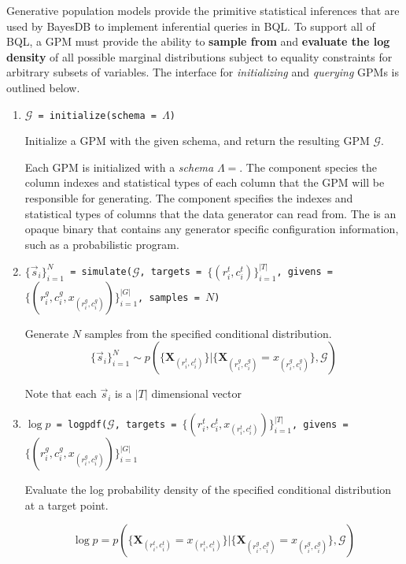 \documentclass[10pt,letterpaper]{article}
\newcommand{\set}[1]{\{#1\}}
\begin{document}
Generative population models provide the primitive statistical inferences that
are used by BayesDB to implement inferential queries in BQL. To support all of
BQL, a GPM must provide the ability to \textbf{sample from} and \textbf{evaluate
the log density} of all possible marginal distributions subject to equality
constraints for arbitrary subsets of variables. The interface for
\textit{initializing} and \textit{querying} GPMs is outlined below.

\begin{enumerate}

\item \texttt{$\mathcal{G}$ = initialize(schema = $\Lambda$)}

    Initialize a GPM with the given schema, and return the resulting GPM
    $\mathcal{G}$.

    Each GPM is initialized with a \textit{schema} $\Lambda=$. The  component species
    the column indexes and statistical types of each column that the GPM will be
    responsible for generating. The  component specifies the
    indexes and statistical types of columns that the data generator can read
    from. The  is an opaque binary that contains any generator
    specific configuration information, such as a probabilistic program.

\item \texttt{$\set{\vec{s}_i}_{i=1}^N$ = 
    simulate($\mathcal{G}$, targets = $\set{(r_i^t,c_i^t)}_{i=1}^{|T|}$, givens
    = $\set{(r_i^g, c_i^g, x_{(r_i^g, c_i^g)})}_{i=1}^{|G|}$, samples = $N$)}

    Generate $N$ samples from the specified conditional distribution.
    $$
    \set{\vec{s}_i}_{i=1}^N \sim p( \set{ \mathbf{X}_{(r_i^t,c_i^t)} } |
    \set{ \mathbf{X}_{(r_i^g,c_i^g)} = x_{(r_i^g,c_i^g)} }, \mathcal{G})
    $$

    Note that each $\vec{s}_i$ is a $|T|$ dimensional vector

\item \texttt{$\log p$ =
    logpdf($\mathcal{G}$, targets = $\set{(r_i^t, c_i^t, x_{(r_i^t,
    c_i^t)})}_{i=1}^{|T|}$, givens = $\set{(r_i^g, c_i^g, x_{(r_i^g,
    c_i^g)})}_{i=1}^{|G|}$}

    Evaluate the log probability density of the specified conditional
    distribution at a target point.

    $$
    \log p = p( \set{ \mathbf{X}_{(r_i^t,c_i^t)} = x_{(r_i^t,c_i^t)} } |
    \set{ \mathbf{X}_{(r_i^g,c_i^g)} = x_{(r_i^g,c_i^g)} }, \mathcal{G})
    $$

\end{enumerate}
\end{document}
